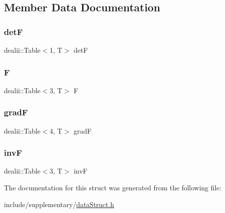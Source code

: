 \subsection{Member Data Documentation}
\mbox{\label{structdeformation_mapwith_grad_aa1ff2dc8fb6f4f6e9125ca026505a977}} 
\subsubsection{\texorpdfstring{detF}{detF}}
{\footnotesize\ttfamily dealii\+::\+Table$<$1, T$>$ detF}

\mbox{\label{structdeformation_mapwith_grad_a7934bed7ba72b5e4a3af1fd8a4e14198}} 
\subsubsection{\texorpdfstring{F}{F}}
{\footnotesize\ttfamily dealii\+::\+Table$<$3, T$>$ F}

\mbox{\label{structdeformation_mapwith_grad_a5bd7f05522c7d581d02e4de55682f5f2}} 
\subsubsection{\texorpdfstring{gradF}{gradF}}
{\footnotesize\ttfamily dealii\+::\+Table$<$4, T$>$ gradF}

\mbox{\label{structdeformation_mapwith_grad_ae40deb9e4616ec6d0b77519e56646ce0}} 
\subsubsection{\texorpdfstring{invF}{invF}}
{\footnotesize\ttfamily dealii\+::\+Table$<$3, T$>$ invF}



The documentation for this struct was generated from the following file\+:\begin{DoxyCompactItemize}
\item 
include/supplementary/\mbox{\hyperlink{data_struct_8h}{data\+Struct.\+h}}\end{DoxyCompactItemize}
